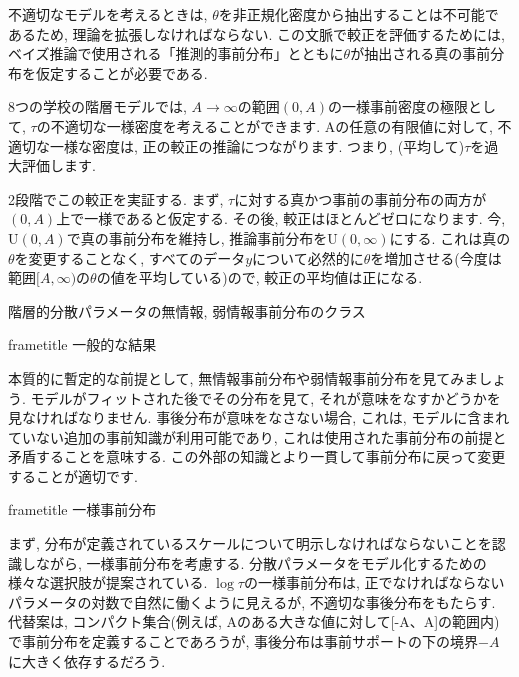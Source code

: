 \documentclass[10pt,dvipdfmx,a4]{beamer}
\newcommand{\dbox}[1]{\begin{beamercolorbox}[wd=122mm, sep=0pt, shadow=false, rounded=false]{frametitle} { #1}\end{beamercolorbox}}
\begin{document}

\begin{frame}
不適切なモデルを考えるときは, $\theta$を非正規化密度から抽出することは不可能であるため, 理論を拡張しなければならない.
この文脈で較正を評価するためには, ベイズ推論で使用される「推測的事前分布」とともに$\theta$が抽出される真の事前分布を仮定することが必要である.

8つの学校の階層モデルでは, $A\rightarrow\infty$の範囲$(0, A)$の一様事前密度の極限として, $\tau$の不適切な一様密度を考えることができます.
Aの任意の有限値に対して, 不適切な一様な密度は, 正の較正の推論につながります.
つまり, (平均して)$\tau$を過大評価します.

2段階でこの較正を実証する.
まず, $\tau$に対する真かつ事前の事前分布の両方が$(0, A)$上で一様であると仮定する.
その後, 較正はほとんどゼロになります.
今, $\text{U}(0, A)$で真の事前分布を維持し, 推論事前分布を$\text{U}(0, \infty)$にする.
これは真の$\theta$を変更することなく, すべてのデータ$y$について必然的に$\theta$を増加させる(今度は範囲$[A, \infty)$の$\theta$の値を平均している)ので, 較正の平均値は正になる.
\end{frame}


\begin{frame}{階層的分散パラメータの無情報, 弱情報事前分布のクラス}
\dbox{一般的な結果}
本質的に暫定的な前提として, 無情報事前分布や弱情報事前分布を見てみましょう.
モデルがフィットされた後でその分布を見て, それが意味をなすかどうかを見なければなりません.
事後分布が意味をなさない場合, これは, モデルに含まれていない追加の事前知識が利用可能であり, これは使用された事前分布の前提と矛盾することを意味する.
この外部の知識とより一貫して事前分布に戻って変更することが適切です.

\dbox{一様事前分布}
まず, 分布が定義されているスケールについて明示しなければならないことを認識しながら, 一様事前分布を考慮する.
分散パラメータをモデル化するための様々な選択肢が提案されている.
$\log\tau$の一様事前分布は, 正でなければならないパラメータの対数で自然に働くように見えるが, 不適切な事後分布をもたらす.
代替案は, コンパクト集合(例えば, Aのある大きな値に対して[-A、A]の範囲内)で事前分布を定義することであろうが, 事後分布は事前サポートの下の境界$-A$に大きく依存するだろう.
\end{frame}

\end{document}
